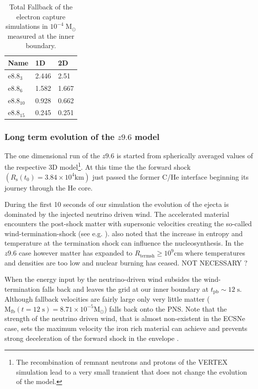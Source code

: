 \documentclass[fleqn,usenatbib]{mnras}
\newcommand{\vertex}{\textsc{V{\footnotesize ERTEX}}\xspace}
\newcommand{\COM}[1]{{\color{red}#1}}
\begin{document}
\begin{table}
  \begin{tabular}{l| l | l }
  Name & 1D & 2D \\
  \hline \hline
  $\mathrm{e}8.8_{3}$ & 2.446   &   2.51  \\
  $\mathrm{e}8.8_{6}$ & 1.582   &   1.667  \\
  $\mathrm{e}8.8_{10}$ & 0.928  &   0.662  \\
  $\mathrm{e}8.8_{15}$ & 0.245  &   0.251 \\
  \end{tabular}
    \caption{Total Fallback of the electron capture simulations in $\mathrm{10^{-4}\;M_{\odot}}$ measured at the inner boundary. }
    \label{table:long term overview}
\end{table}

\subsubsection{Long term evolution of the $z9.6$ model}
\label{subsec:z96 1d}
The one dimensional run of the $z9.6$ is started from spherically averaged values of the respective 3D model\footnote{The recombination of remnant neutrons and protons of the \vertex simulation lead to a very small transient that does not change the evolution of the model.}. At this time the the forward shock $(R_{\mathrm{s}}(t_0) = 3.84\times 10^4 \mathrm{km})$ just passed the former C/He interface beginning its journey through the He core.

During the first 10 seconds of our simulation the evolution of the ejecta is dominated by the injected neutrino driven wind. The accelerated material encounters the post-shock matter with supersonic velocities creating the so-called wind-termination-shock (see e.g. \citet{Arcones2006}). \COM{\citet{Arcones2006} also noted that the increase in entropy and temperature at the termination shock can influence the nucleosynthesis. In the $z9.6$ case however matter has expanded to  $R_{\mathrm{term sh}} \geq 10^{9}\mathrm{cm}$ where temperatures and densities are too low and nuclear burning has ceased. NOT NECESSARY ?} 

When the energy input by the neutrino-driven wind subsides the wind-termination falls back and leaves the grid at our inner boundary at $t_{\mathrm{pb}}\sim 12\;\mathrm{s}$. Although fallback velocities are fairly large only very little matter ($\mathrm{M_{fb}}(t=12\;\mathrm{s})=8.71\times 10^{-5}\mathrm{M_{\odot}}$) falls back onto the PNS. Note that the strength of the neutrino driven wind, that is almost non-existent in the ECSNe case, sets the maximum velocity the iron rich material can achieve and prevents strong deceleration of the forward shock in the envelope \citep{Wongwathanarat2015}. 
\end{document}
